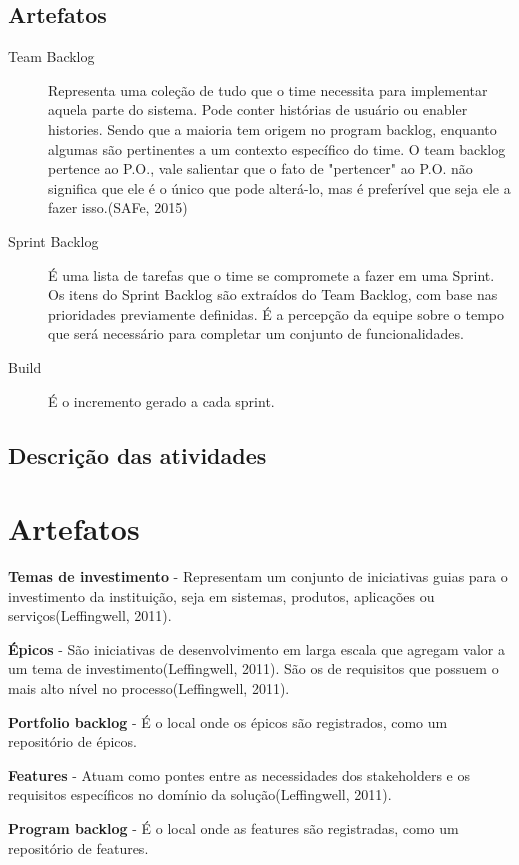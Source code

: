 \subsection{Artefatos}
\begin{description}
\item[Team Backlog] Representa uma coleção de tudo que o time necessita para implementar aquela parte do sistema. Pode conter histórias de usuário ou enabler histories. Sendo que a maioria tem origem no program backlog, enquanto algumas são pertinentes a um contexto específico do time. O team backlog pertence ao P.O., vale salientar que o fato de "pertencer" ao P.O. não significa que ele é o único que pode alterá-lo, mas é preferível que seja ele a fazer isso.(SAFe, 2015)
\item[Sprint Backlog] É uma lista de tarefas que o time se compromete a fazer em uma Sprint. Os itens do Sprint Backlog são extraídos do Team Backlog, com base nas prioridades previamente definidas. É a percepção da equipe sobre o tempo que será necessário para completar um conjunto de funcionalidades.
\item[Build] É o incremento gerado a cada sprint.
\end{description}

\subsection{Descrição das atividades}

\section{Artefatos}
\textbf{Temas de investimento} - Representam um conjunto de iniciativas guias para o investimento da instituição, seja em sistemas, produtos, aplicações ou serviços(Leffingwell, 2011).

\textbf{Épicos} - São iniciativas de desenvolvimento em larga escala que agregam valor a um tema de investimento(Leffingwell, 2011). São os de requisitos que possuem o mais alto nível no processo(Leffingwell, 2011).

\textbf{Portfolio backlog} - É o local onde os épicos são registrados, como um repositório de épicos.

\textbf{Features} - Atuam como pontes entre as necessidades dos stakeholders e os requisitos específicos no domínio da solução(Leffingwell, 2011).

\textbf{Program backlog} - É o local onde as features são registradas, como um repositório de features.

